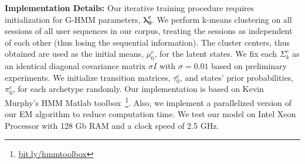 \textbf{Implementation Details: }
Our iterative training procedure requires initialization for G-HMM parameters, $\mathbf{\lambda^c_0}$. We perform k-means clustering on all sessions of all user sequences in our corpus, treating the sessions as independent of each other (thus losing the sequential information). The cluster centers, thus obtained are used as the initial means, $\mu^c_0$, for the latent states. We fix each $\Sigma^c_k$ as an identical diagonal covariance matrix $\sigma I$ with $\sigma = 0.01$ based on preliminary experiments. We initialize transition matrices, $\tau^c_0$, and states' prior probabilities, $\pi^c_0$, for each archetype randomly.
Our implementation is based on Kevin Murphy's HMM Matlab toolbox~\footnote{\url{bit.ly/hmmtoolbox}}. Also, we implement a parallelized version of our EM algorithm to reduce computation time. We test our model on Intel Xeon Processor with 128 Gb RAM and a clock speed of 2.5 GHz.
